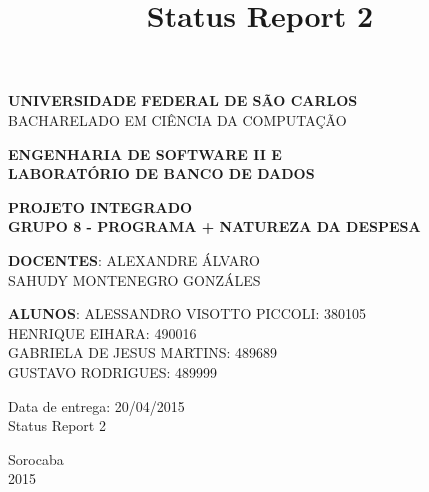 \documentclass[a4paper,12pt]{article}
\title{Status Report 2}
\begin{document}
\renewcommand*\sectionmark[1]{\markboth{#1}{}}
\renewcommand*\subsectionmark[1]{\markboth{#1}{}}


\begin{titlepage}
\begin{center}
{\bf \large UNIVERSIDADE FEDERAL DE SÃO CARLOS}\\[0.2cm]
{\large BACHARELADO EM CIÊNCIA DA COMPUTAÇÃO}\\[0.2cm]

\end{center}

\vfill
\begin{center}
{\bf \large ENGENHARIA DE SOFTWARE II E\\LABORATÓRIO DE BANCO DE DADOS}\\[3.2cm]
\end{center}

\begin{center}
{\bf \LARGE PROJETO INTEGRADO}\\[0.3cm]
{\bf \Large GRUPO 8 - PROGRAMA + NATUREZA DA DESPESA}\\[2.2cm]
\end{center}

\vfill
\begin{flushright}
{\large \textbf{DOCENTES}: ALEXANDRE ÁLVARO}\\[0.2cm]
{\large SAHUDY MONTENEGRO GONZÁLES}\\[0.5cm]
\end{flushright}

\vfill
\begin{flushright}
{\large {\bf ALUNOS}: ALESSANDRO VISOTTO PICCOLI: 380105}\\[0.15cm]
{\large HENRIQUE EIHARA: 490016}\\[0.15cm]
{\large GABRIELA DE JESUS MARTINS: 489689}\\[0.15cm]
{\large GUSTAVO RODRIGUES: 489999}\\[0.15cm]
\end{flushright}

\vfill
\begin{flushright}
{\large Data de entrega: 20/04/2015}\\[0.2cm]
{\large Status Report 2}\\[2.0cm]
\end{flushright}

\begin{center}
{\large Sorocaba}\\[0.2cm]
{\large 2015}
\end{center}

\end{titlepage}
\end{document}
